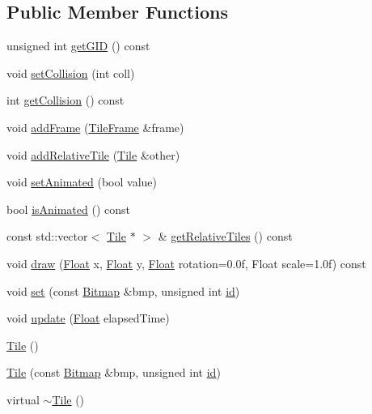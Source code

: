 \subsection*{Public Member Functions}
\begin{DoxyCompactItemize}
\item 
unsigned int \hyperlink{classZeta_1_1Tile_a2605879617c901eb63870400b1459f30}{get\+G\+I\+D} () const 
\item 
void \hyperlink{classZeta_1_1Tile_a1dc7e317950b40aa79e25bf8c5108b44}{set\+Collision} (int coll)
\item 
int \hyperlink{classZeta_1_1Tile_a680a98169e1f5bc5ed929e55458670af}{get\+Collision} () const 
\item 
void \hyperlink{classZeta_1_1Tile_a2893f0b4e1fe83087757a79335405bd6}{add\+Frame} (\hyperlink{structZeta_1_1Tile_1_1TileFrame}{Tile\+Frame} \&frame)
\item 
void \hyperlink{classZeta_1_1Tile_a55269b5653598909030d67b05334154c}{add\+Relative\+Tile} (\hyperlink{classZeta_1_1Tile}{Tile} \&other)
\item 
void \hyperlink{classZeta_1_1Tile_a60843b6e0db0807cfc8ad6b265174ef7}{set\+Animated} (bool value)
\item 
bool \hyperlink{classZeta_1_1Tile_a1dbf9bcc8c3dc0c03de9eafe50e01e3d}{is\+Animated} () const 
\item 
const std\+::vector$<$ \hyperlink{classZeta_1_1Tile}{Tile} $\ast$ $>$ \& \hyperlink{classZeta_1_1Tile_a78dab2f64a620fdc26ae7bd60fa30d5b}{get\+Relative\+Tiles} () const 
\item 
void \hyperlink{classZeta_1_1Tile_a272534e2d1aeca3057cece7fdefece72}{draw} (\hyperlink{namespaceZeta_a1e0a1265f9b3bd3075fb0fabd39088ba}{Float} x, \hyperlink{namespaceZeta_a1e0a1265f9b3bd3075fb0fabd39088ba}{Float} y, \hyperlink{namespaceZeta_a1e0a1265f9b3bd3075fb0fabd39088ba}{Float} rotation=0.\+0f, Float scale=1.\+0f) const 
\item 
void \hyperlink{classZeta_1_1Tile_ada0187d097d6b51c20dd3cef9103b41f}{set} (const \hyperlink{classZeta_1_1Bitmap}{Bitmap} \&bmp, unsigned int \hyperlink{classZeta_1_1Tile_a73e4f7fc4c4770d3dd4ddd823f168944}{id})
\item 
void \hyperlink{classZeta_1_1Tile_a7efa5c5a7d45ef571f12900f7ba2f11c}{update} (\hyperlink{namespaceZeta_a1e0a1265f9b3bd3075fb0fabd39088ba}{Float} elapsed\+Time)
\item 
\hyperlink{classZeta_1_1Tile_a33756b3554776031cc7f2a46919c020c}{Tile} ()
\item 
\hyperlink{classZeta_1_1Tile_a4dddb2eba3e006220022931e820fefe5}{Tile} (const \hyperlink{classZeta_1_1Bitmap}{Bitmap} \&bmp, unsigned int \hyperlink{classZeta_1_1Tile_a73e4f7fc4c4770d3dd4ddd823f168944}{id})
\item 
virtual \hyperlink{classZeta_1_1Tile_a807a04438f5ee741791b41141962a772}{$\sim$\+Tile} ()
\end{DoxyCompactItemize}
